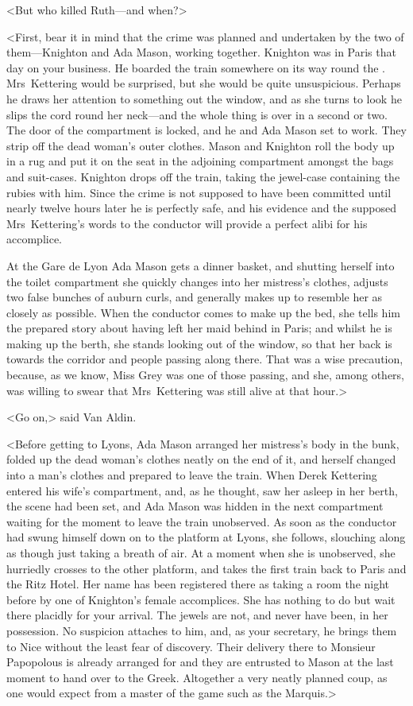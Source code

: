 <But who killed Ruth—and when?>

<First, bear it in mind that the crime was planned and undertaken by the two of them—Knighton and Ada Mason, working together. Knighton was in Paris that day on your business. He boarded the train somewhere on its way round the . Mrs~Kettering would be surprised, but she would be quite unsuspicious. Perhaps he draws her attention to something out the window, and as she turns to look he slips the cord round her neck—and the whole thing is over in a second or two. The door of the compartment is locked, and he and Ada Mason set to work. They strip off the dead woman's outer clothes. Mason and Knighton roll the body up in a rug and put it on the seat in the adjoining compartment amongst the bags and suit-cases. Knighton drops off the train, taking the jewel-case containing the rubies with him. Since the crime is not supposed to have been committed until nearly twelve hours later he is perfectly safe, and his evidence and the supposed Mrs~Kettering's words to the conductor will provide a perfect alibi for his accomplice.

At the Gare de Lyon Ada Mason gets a dinner basket, and shutting herself into the toilet compartment she quickly changes into her mistress's clothes, adjusts two false bunches of auburn curls, and generally makes up to resemble her as closely as possible. When the conductor comes to make up the bed, she tells him the prepared story about having left her maid behind in Paris; and whilst he is making up the berth, she stands looking out of the window, so that her back is towards the corridor and people passing along there. That was a wise precaution, because, as we know, Miss Grey was one of those passing, and she, among others, was willing to swear that Mrs~Kettering was still alive at that hour.>

<Go on,> said Van Aldin.

<Before getting to Lyons, Ada Mason arranged her mistress's body in the bunk, folded up the dead woman's clothes neatly on the end of it, and herself changed into a man's clothes and prepared to leave the train. When Derek Kettering entered his wife's compartment, and, as he thought, saw her asleep in her berth, the scene had been set, and Ada Mason was hidden in the next compartment waiting for the moment to leave the train unobserved. As soon as the conductor had swung himself down on to the platform at Lyons, she follows, slouching along as though just taking a breath of air. At a moment when she is unobserved, she hurriedly crosses to the other platform, and takes the first train back to Paris and the Ritz Hotel. Her name has been registered there as taking a room the night before by one of Knighton's female accomplices. She has nothing to do but wait there placidly for your arrival. The jewels are not, and never have been, in her possession. No suspicion attaches to him, and, as your secretary, he brings them to Nice without the least fear of discovery. Their delivery there to Monsieur Papopolous is already arranged for and they are entrusted to Mason at the last moment to hand over to the Greek. Altogether a very neatly planned coup, as one would expect from a master of the game such as the Marquis.>


